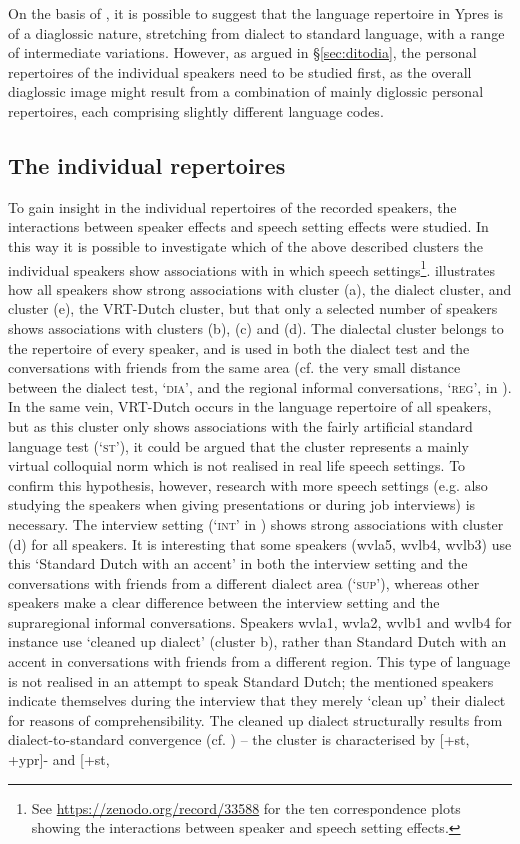 \documentclass[output=paper]{LSP/langsci}
\begin{document}
On the basis of , it is possible to suggest that the language repertoire in Ypres is of a diaglossic nature, stretching from dialect to standard language, with a range of intermediate variations. However, as argued in §\ref{sec:ditodia}, the personal repertoires of the individual speakers need to be studied first, as the overall diaglossic image might result from a combination of mainly diglossic personal repertoires, each comprising slightly different language codes.

\subsection{The individual repertoires}
\label{individual}

To gain insight in the individual repertoires of the recorded speakers, the interactions between speaker effects and speech setting effects were studied. In this way it is possible to investigate which of the above described clusters the individual speakers show associations with in which speech settings\footnote{See \url{https://zenodo.org/record/33588} for the ten correspondence plots showing the interactions between speaker and speech setting effects.}.  illustrates how all speakers show strong associations with cluster (a), the dialect cluster, and cluster (e), the VRT-Dutch cluster, but that only a selected number of speakers shows associations with clusters (b), (c) and (d). The dialectal cluster belongs to the repertoire of every speaker, and is used in both the dialect test and the conversations with friends from the same area (cf. the very small distance between the dialect test, ‘\textsc{dia’}, and the regional informal conversations, ‘\textsc{reg’}, in ). In the same vein, VRT-Dutch occurs in the language repertoire of all speakers, but as this cluster only shows associations with the fairly artificial standard language test (‘\textsc{st’}), it could be argued that the cluster represents a mainly virtual colloquial norm which is not realised in real life speech settings. To confirm this hypothesis, however, research with more speech settings (e.g. also studying the speakers when giving presentations or during job interviews) is necessary. The interview setting (‘\textsc{int’} in ) shows strong associations with cluster (d) for all speakers. It is interesting that some speakers (wvla5, wvlb4, wvlb3) use this ‘Standard Dutch with an accent’ in both the interview setting and the conversations with friends from a different dialect area (‘\textsc{sup’}), whereas other speakers make a clear difference between the interview setting and the supraregional informal conversations. Speakers wvla1, wvla2, wvlb1 and wvlb4 for instance use ‘cleaned up dialect’ (cluster b), rather than Standard Dutch with an accent in conversations with friends from a different region. This type of language is not realised in an attempt to speak Standard Dutch; the mentioned speakers indicate themselves during the interview that they merely ‘clean up’ their dialect for reasons of comprehensibility. The cleaned up dialect structurally results from dialect-to-standard convergence (cf. \citealt[25]{auer_europes_2005}) – the cluster is characterised by [+st, +ypr]- and [+st, 
\end{document}
